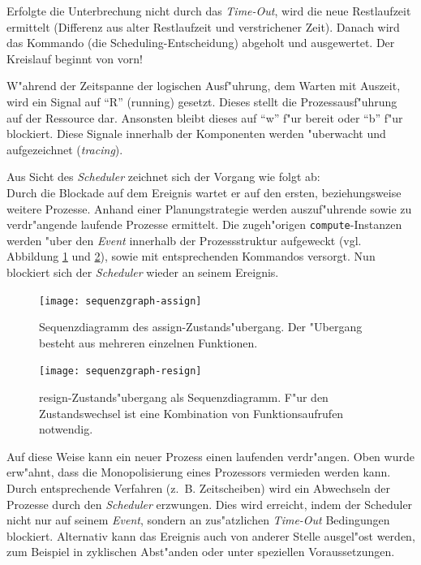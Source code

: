 Erfolgte die Unterbrechung nicht durch das \emph{Time-Out}, wird die neue
Restlaufzeit ermittelt (Differenz aus alter Restlaufzeit und verstrichener
Zeit). Danach wird das Kommando (die Scheduling-Entscheidung) abgeholt und
ausgewertet. Der Kreislauf beginnt von vorn!

W"ahrend der Zeitspanne der logischen Ausf"uhrung, dem Warten mit Auszeit, wird
ein Signal auf ``R'' (running) gesetzt. Dieses stellt die Prozessausf"uhrung auf
der Ressource dar. Ansonsten bleibt dieses auf ``w'' f"ur bereit oder ``b'' f"ur 
blockiert. Diese Signale innerhalb der Komponenten werden "uberwacht und 
aufgezeichnet (\emph{tracing}).

Aus Sicht des \emph{Scheduler} zeichnet sich der Vorgang wie folgt ab:\\
Durch die Blockade auf dem Ereignis wartet er auf den ersten, beziehungsweise
weitere Prozesse. Anhand einer Planungstrategie werden auszuf"uhrende
sowie zu verdr"angende laufende Prozesse ermittelt. Die zugeh"origen
\verb|compute|-Instanzen werden "uber den \emph{Event} innerhalb der
Prozessstruktur aufgeweckt (vgl. Abbildung \ref{fig:seq-assign} und
\ref{fig:seq-resign}), sowie mit entsprechenden Kommandos versorgt. Nun 
blockiert sich der \emph{Scheduler} wieder an seinem Ereignis.
\begin{figure}
\begin{center}
\texttt{[image: sequenzgraph-assign]}
\caption{Sequenzdiagramm des assign-Zustands"ubergang. Der "Ubergang besteht aus
mehreren einzelnen Funktionen.}
\label{fig:seq-assign}
\end{center}
\end{figure}
\begin{figure}
\begin{center}
\texttt{[image: sequenzgraph-resign]}
\caption{resign-Zustands"ubergang als Sequenzdiagramm. F"ur den Zustandswechsel
  ist eine Kombination von Funktionsaufrufen notwendig.}
\label{fig:seq-resign}
\end{center}
\end{figure}

Auf diese Weise kann ein neuer Prozess einen laufenden verdr"angen. Oben wurde
erw"ahnt, dass die Monopolisierung eines Prozessors vermieden werden kann. Durch
entsprechende Verfahren (z.~B. Zeitscheiben) wird ein Abwechseln der
Prozesse durch den \emph{Scheduler} erzwungen. Dies wird erreicht, indem der
Scheduler nicht nur auf seinem \emph{Event}, sondern an zus"atzlichen
\emph{Time-Out} Bedingungen blockiert. Alternativ kann das
Ereignis auch von anderer Stelle ausgel"ost werden, zum Beispiel in zyklischen
Abst"anden oder unter speziellen Voraussetzungen.

